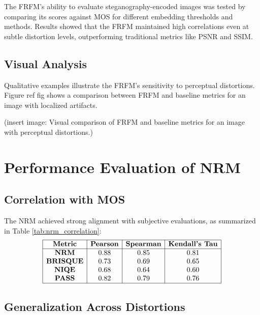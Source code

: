 The FRFM's ability to evaluate steganography-encoded images was tested by comparing its scores against MOS for different embedding thresholds and methods. Results showed that the FRFM maintained high correlations even at subtle distortion levels, outperforming traditional metrics like PSNR and SSIM.

\subsection{Visual Analysis}

Qualitative examples illustrate the FRFM's sensitivity to perceptual distortions. Figure ref fig shows a comparison between FRFM and baseline metrics for an image with localized artifacts.


(insert image: Visual comparison of FRFM and baseline metrics for an image with perceptual distortions.)

\section{Performance Evaluation of NRM}

\subsection{Correlation with MOS}

The NRM achieved strong alignment with subjective evaluations, as summarized in Table \ref{tab:nrm_correlation}:
\[
\begin{array}{|c|c|c|c|}
\hline
\textbf{Metric} & \textbf{Pearson} & \textbf{Spearman} & \textbf{Kendall's Tau} \\
\hline
\textbf{NRM} & 0.88 & 0.85 & 0.81 \\
\textbf{BRISQUE} & 0.73 & 0.69 & 0.65 \\
\textbf{NIQE} & 0.68 & 0.64 & 0.60 \\
\textbf{PASS} & 0.82 & 0.79 & 0.76 \\
\hline
\end{array}\label{tab:nrm_correlation}
\]

\subsection{Generalization Across Distortions}


